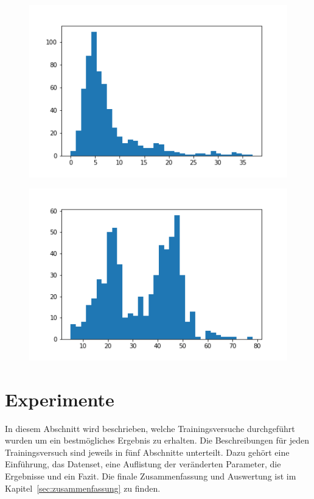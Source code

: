 \documentclass[pdftex,a4paper,halfparskip, article]{scrartcl}
\begin{document}
\begin{figure}
\centering
\begin{minipage}{.5\textwidth}
  \centering
  \includegraphics[width=.8\linewidth]{predictions_bin10_histogramm}
  \label{fig:bsp_plot_good}
\end{minipage}%
\begin{minipage}{.5\textwidth}
  \centering
  \includegraphics[width=.8\linewidth]{predictions_bin12_histogramm}
  \label{fig:bsp_plot_bad}
\end{minipage}
\end{figure}

\newpage
\section{Experimente}\label{sec:experimente}

In diesem Abschnitt wird beschrieben, welche Trainingsversuche durchgeführt wurden um ein bestmögliches Ergebnis zu erhalten. Die Beschreibungen für jeden Trainingsversuch sind jeweils in fünf Abschnitte unterteilt. Dazu gehört eine Einführung, das Datenset, eine Auflistung der veränderten Parameter, die Ergebnisse und ein Fazit.
Die finale Zusammenfassung und Auswertung ist im Kapitel~\ref{sec:zusammenfassung} zu finden.
\end{document}
